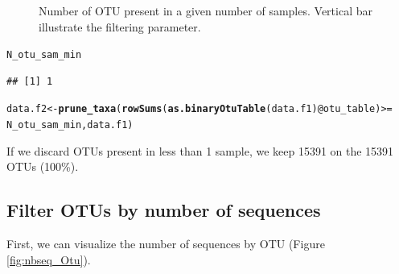 \documentclass[12pt]{article}\usepackage[]{graphicx}\usepackage[]{color}
\makeatletter
\newcommand{\hlopt}[1]{\textcolor[rgb]{0,0,0}{#1}}%
\newcommand{\hlstd}[1]{\textcolor[rgb]{0.345,0.345,0.345}{#1}}%
\newcommand{\hlkwb}[1]{\textcolor[rgb]{0.69,0.353,0.396}{#1}}%
\newcommand{\hlkwc}[1]{\textcolor[rgb]{0.333,0.667,0.333}{#1}}%
\newcommand{\hlkwd}[1]{\textcolor[rgb]{0.737,0.353,0.396}{\textbf{#1}}}%
\newenvironment{kframe}{%
 \def\at@end@of@kframe{}%
 \ifinner\ifhmode%
  \def\at@end@of@kframe{\end{minipage}}%
  \begin{minipage}{\columnwidth}%
 \fi\fi%
 \def\FrameCommand##1{\hskip\@totalleftmargin \hskip-\fboxsep
 \colorbox{shadecolor}{##1}\hskip-\fboxsep
     \hskip-\linewidth \hskip-\@totalleftmargin \hskip\columnwidth}%
 \MakeFramed {\advance\hsize-\width
   \@totalleftmargin\z@ \linewidth\hsize
   \@setminipage}}%
 {\par\unskip\endMakeFramed%
 \at@end@of@kframe}
\newenvironment{knitrout}{}{} %
\numberwithin{figure}{section}
\makeatother
\begin{document}
\begin{knitrout}
\begin{figure}
{}

\caption[Number of OTU present in a given number of samples]{Number of OTU present in a given number of samples. Vertical bar illustrate the filtering parameter.}\label{fig:nbOtu_sample}
\end{figure}


\end{knitrout}

\begin{knitrout}\small
{}\color{fgcolor}\begin{kframe}
\begin{alltt}
\hlstd{N_otu_sam_min}
\end{alltt}
\begin{verbatim}
## [1] 1
\end{verbatim}
\end{kframe}
\end{knitrout}

\begin{knitrout}\small
{}\color{fgcolor}\begin{kframe}
\begin{alltt}
\hlstd{data.f2} \hlkwb{<-} \hlkwd{prune_taxa}\hlstd{(}\hlkwd{rowSums}\hlstd{(}\hlkwd{as.binaryOtuTable}\hlstd{(data.f1)}\hlopt{@}\hlkwc{otu_table}\hlstd{)} \hlopt{>=}
                        \hlstd{N_otu_sam_min, data.f1)}
\end{alltt}
\end{kframe}
\end{knitrout}

If we discard OTUs present in less than 1 sample, we keep 15391 on the 15391 OTUs (100\%).

 \subsection{Filter OTUs by number of sequences}

 First, we can visualize the number of sequences by OTU (Figure \ref{fig:nbseq_Otu}).
\end{document}

